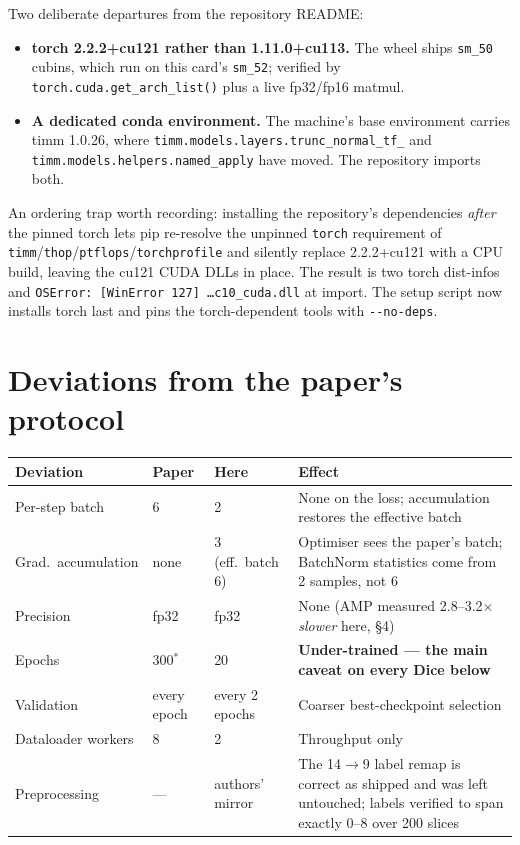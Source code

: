 \documentclass[11pt,a4paper]{article}
\newcommand{\code}[1]{\texttt{\small #1}}
\begin{document}
Two deliberate departures from the repository README:

\begin{itemize}
\item \textbf{torch 2.2.2+cu121 rather than 1.11.0+cu113.} The wheel ships
\code{sm\_50} cubins, which run on this card's \code{sm\_52}; verified by
\code{torch.cuda.get\_arch\_list()} plus a live fp32/fp16 matmul.
\item \textbf{A dedicated conda environment.} The machine's base environment
carries timm 1.0.26, where \code{timm.models.layers.trunc\_normal\_tf\_} and
\code{timm.models.helpers.named\_apply} have moved. The repository imports both.
\end{itemize}

An ordering trap worth recording: installing the repository's dependencies
\emph{after} the pinned torch lets pip re-resolve the unpinned \code{torch}
requirement of \code{timm}/\code{thop}/\code{ptflops}/\code{torchprofile} and
silently replace 2.2.2+cu121 with a CPU build, leaving the cu121 CUDA DLLs in
place. The result is two torch dist-infos and
\code{OSError: [WinError 127] \ldots c10\_cuda.dll} at import. The setup script
now installs torch last and pins the torch-dependent tools with
\code{-{}-no-deps}.

\section{Deviations from the paper's protocol}

\begin{center}
\begin{tabular}{@{}p{3.0cm}p{1.5cm}p{3.0cm}p{6.2cm}@{}}
\toprule
\textbf{Deviation} & \textbf{Paper} & \textbf{Here} & \textbf{Effect} \\
\midrule
Per-step batch & 6 & 2 & None on the loss; accumulation restores the effective batch \\
Grad.\ accumulation & none & 3 (eff.\ batch 6) & Optimiser sees the paper's batch; BatchNorm statistics come from 2 samples, not 6 \\
Precision & fp32 & fp32 & None (AMP measured 2.8--3.2$\times$ \emph{slower} here, \S4) \\
Epochs & 300$^\ast$ & 20 & \textbf{Under-trained --- the main caveat on every Dice below} \\
Validation & every epoch & every 2 epochs & Coarser best-checkpoint selection \\
Dataloader workers & 8 & 2 & Throughput only \\
Preprocessing & --- & authors' mirror & The 14$\rightarrow$9 label remap is correct as shipped and was left untouched; labels verified to span exactly 0--8 over 200 slices \\
\bottomrule
\end{tabular}
\end{center}
\end{document}

